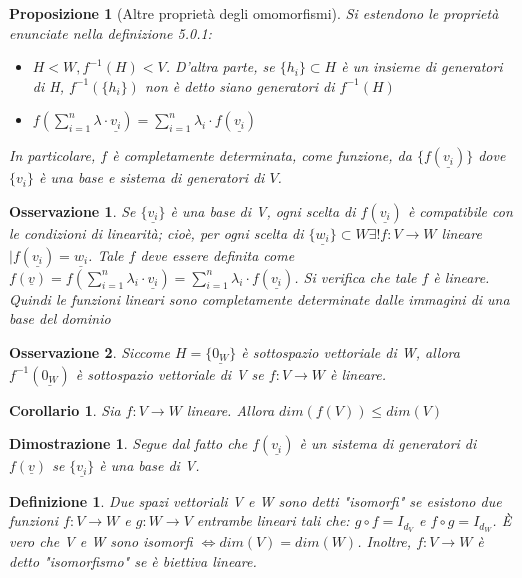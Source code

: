 \documentclass[12pt]{article}
\newenvironment{para}{\begin{adjustwidth}{13mm}{}}{\end{adjustwidth}}
\newtheorem{Definizione}{Definizione}[subsection]
\newtheorem{Corollario}{Corollario}[subsection]
\newtheorem{Proposizione}{Proposizione}[subsection]
\newtheorem{Dimostrazione}{Dimostrazione}[subsection]
\newtheorem{Osservazione}{Osservazione}[subsection]
\begin{document}
\begin{para}
\begin{Proposizione}[Altre proprietà degli omomorfismi]
Si estendono le proprietà enunciate nella definizione 5.0.1:
\begin{itemize}
    \item $H<W, f^{-1}(H) < V$. D'altra parte, se $\{h_i\}\subset H$ è un insieme di generatori di H, $f^{-1}(\{h_i\})$ non è detto siano generatori di $f^{-1}(H)$
    \item $f(\sum_{i=1}^n \lambda \cdot \underline{v_i}) = \sum_{i=1}^n\lambda_i \cdot f(\underline{v_i})$
\end{itemize}
In particolare, $f$ è completamente determinata, come funzione, da $\{f(\underline{v_i})\}$ dove $\{v_i\}$ è una base e sistema di generatori di $V$.
\end{Proposizione}
\begin{Osservazione}
    Se $\{\underline{v_i}\}$ è una base di V, ogni scelta di $f(\underline{v_i})$ è compatibile con le condizioni di linearità; cioè, per ogni scelta di $\{\underline{w_i}\}\subset W \exists ! f:V \rightarrow W$ lineare $| f(\underline{v_i})=\underline{w_i}$. Tale $f$ deve essere definita come $f(\underline{v}) = f(\sum_{i=1}^n \lambda_i \cdot \underline{v_i}) = \sum_{i=1}^n \lambda_i \cdot f(\underline{v_i})$. Si verifica che tale $f$ è lineare. Quindi le funzioni lineari sono completamente determinate dalle immagini di una base del dominio
\end{Osservazione}
\begin{Osservazione}
    Siccome $H = \{\underline{0_W}\}$ è sottospazio vettoriale di W, allora $f^{-1}(\underline{0_W})$ è sottospazio vettoriale di V se $f:V \rightarrow W$ è lineare.
\end{Osservazione}
\begin{Corollario}
    Sia $f:V\rightarrow W$ lineare. Allora $dim(f(V)) \le dim(V)$
\end{Corollario}
\begin{Dimostrazione}
    Segue dal fatto che $f(\underline{v_i})$ è un sistema di generatori di $f(\underline{v})$ se $\{\underline{v_i}\}$ è una base di V.
\end{Dimostrazione}
\begin{Definizione}
    Due spazi vettoriali V e W sono detti "isomorfi" se esistono due funzioni $f:V \rightarrow W$ e $g:W \rightarrow V$ entrambe lineari tali che: $g \circ f = I_{d_{V}}$ e $f \circ g = I_{d_W}$. È vero che V e W sono isomorfi $\Leftrightarrow dim(V) = dim(W)$. Inoltre, $f:V \rightarrow W$ è detto "isomorfismo" se è biettiva lineare.
\end{Definizione}

\end{para}
\end{document}
